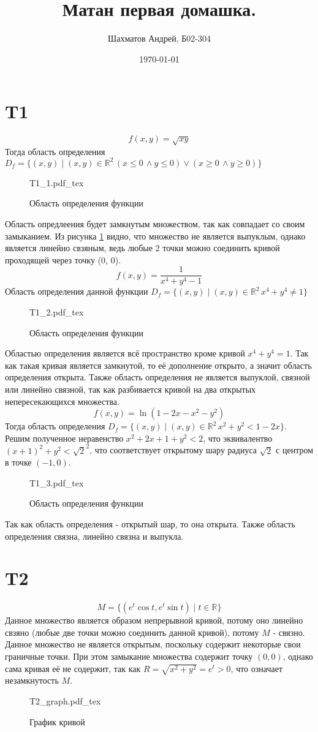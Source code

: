 \documentclass[12pt]{article}
\title{Матан первая домашка.}
\author{Шахматов Андрей, Б02-304}
\date{\today}
\newcommand{\incfig}[1]{
    {#1.pdf_tex}
}
\begin{document}
\maketitle
\tableofcontents

\section{T1}
$$f(x, y) = \sqrt{xy}$$
Тогда область определения $D_f = \{(x, y) \mid (x, y) \in \mathbb{R}^2 \, (x \leq 0 \, \land y \leq 0) \lor (x \geq 0 \, \land y \geq 0)\}$
\begin{figure}[H]
    \centering
    \def\svgwidth{0.7\columnwidth}
    \incfig{T1_1}
    \caption{Область определения функции}
    \label{fig:T1_1}
\end{figure}
Область опредлеения будет замкнутым множеством, так как совпадает со своим замыканием. 
Из рисунка \ref{fig:T1_1} видно, что множество не является выпуклым, однако является линейно свзяным, ведь любые 2 точки можно соединить кривой проходящей через точку (0, 0).
$$f(x, y) = \frac{1}{x^4 + y^4 - 1}$$
Область определения данной функции $D_f = \{(x, y) \mid (x, y) \in \mathbb{R}^2 \, x^4 + y^4 \ne 1 \}$
\begin{figure}[H]
    \centering
    \def\svgwidth{0.7\columnwidth}
    \incfig{T1_2}
    \caption{Область определения функции}
    \label{fig:T1_2}
\end{figure}
Областью определения является всё пространство кроме кривой $x^4 + y^4 = 1$. Так как такая кривая является замкнутой, то её дополнение открыто,
а значит область определения открыта. Также область определения не является выпуклой, связной или линейно связной, так как разбивается кривой на два открытых непересекающихся
множества.
$$f(x, y) = \ln(1 - 2x - x^2 - y^2)$$
Тогда область определения $D_f = \{(x, y) \mid (x, y) \in \mathbb{R}^2 \, x^2 + y^2 < 1 - 2x\}$.
Решим полученное неравенство $x^2 + 2x + 1 + y^2 < 2$, что эквивалентво $(x + 1)^2 + y^2 < \sqrt{2}^2$, 
что соответствует открытому шару радиуса $\sqrt{2}$ с центром в точке $(-1, 0)$.
\begin{figure}[H]
    \centering
    \def\svgwidth{0.7\columnwidth}
    \incfig{T1_3}
    \caption{Область определения функции}
    \label{fig:T1_3}
\end{figure}

Так как область определения - открытый шар, то она открыта. Также область определения связна, линейно связна и выпукла.
\section{T2}
$$M = \{(e^t \cos{t}, e^t \sin{t}) \mid t \in \mathbb{R}\}$$
Данное множество является образом непрерывной кривой, потому оно линейно свзяно (любые две точки можно соединить данной кривой), потому $M$ - связно.
Данное множество не является открытым, поскольку содержит некоторые свои граничные точки. 
При этом замыкание множества содержит точку $(0, 0)$, однако сама кривая её не содержит, так как $R = \sqrt{x^2 + y^2} = e^t > 0$, что 
означает незамкнутость $M$.
\begin{figure}[H]
    \centering
    \def\svgwidth{0.4\columnwidth}
    \incfig{T2_graph}
    \caption{График кривой}
    \label{fig:T2}
\end{figure}
\end{document}
